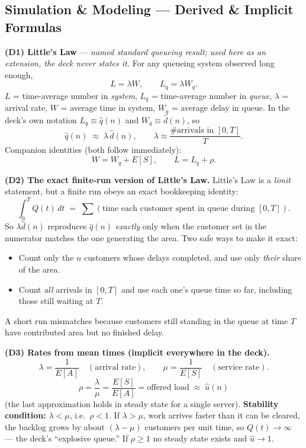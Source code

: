 \subsection{Simulation \& Modeling --- Derived \& Implicit Formulas}

\begin{derivedbox}
\textbf{(D1) Little's Law} --- \emph{named standard queueing result; used here as an extension, the deck never states it.}
For any queueing system observed long enough,
\[
L = \lambda W, \qquad L_q = \lambda W_q .
\]
$L$ = time-average number in \emph{system}, $L_q$ = time-average number in \emph{queue}, $\lambda$ = arrival rate, $W$ = average time in system, $W_q$ = average delay in queue. In the deck's own notation $L_q \equiv \hat q(n)$ and $W_q \equiv \hat d(n)$, so
\[
\hat q(n) \;\approx\; \lambda\,\hat d(n), \qquad \lambda \approx \frac{\text{\# arrivals in }[0,T]}{T}.
\]
Companion identities (both follow immediately):
\[
W = W_q + E[S], \qquad L = L_q + \rho .
\]

\smallskip
\textbf{(D2) The exact finite-run version of Little's Law.} Little's Law is a \emph{limit} statement, but a finite run obeys an exact bookkeeping identity:
\[
\int_0^{T} Q(t)\,dt \;=\; \sum (\text{time each customer spent in queue during }[0,T]).
\]
So $\lambda\hat d(n)$ reproduces $\hat q(n)$ \emph{exactly} only when the customer set in the numerator matches the one generating the area. Two safe ways to make it exact:
\begin{itemize}
\item Count only the $n$ customers whose delays completed, and use only \emph{their} share of the area.
\item Count \emph{all} arrivals in $[0,T]$ and use each one's queue time so far, including those still waiting at $T$.
\end{itemize}
A short run mismatches because customers still standing in the queue at time $T$ have contributed area but no finished delay.

\smallskip
\textbf{(D3) Rates from mean times (implicit everywhere in the deck).}
\[
\lambda = \frac{1}{E[A]} \quad(\text{arrival rate}), \qquad \mu = \frac{1}{E[S]} \quad(\text{service rate}).
\]
\[
\rho = \frac{\lambda}{\mu} = \frac{E[S]}{E[A]} = \text{offered load} \;\approx\; \hat u(n)
\]
(the last approximation holds in steady state for a single server).
\textbf{Stability condition:} $\lambda < \mu$, i.e.\ $\rho < 1$. If $\lambda > \mu$, work arrives faster than it can be cleared, the backlog grows by about $(\lambda-\mu)$ customers per unit time, so $Q(t)\to\infty$ --- the deck's ``explosive queue.'' If $\rho\ge 1$ no steady state exists and $\hat u \to 1$.


\end{derivedbox}
